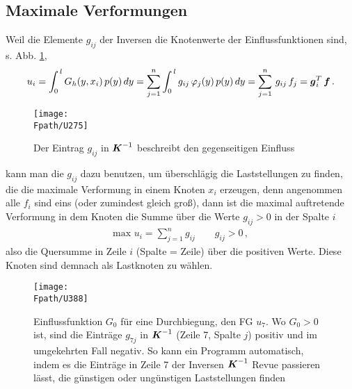 {%
{\textcolor{sectionTitleBlue}{\subsection{Maximale Verformungen}}}\label{Korrektur12}
Weil die Elemente $g_{ij}$ der Inversen die Knotenwerte der Einflussfunktionen sind, s. Abb. \ref{U275},
\begin{align}
u_i = \int_0^{\,l} G_h(y,x_i)\,p(y)\,dy = \sum_{j = 1}^n \int_0^{\,l} g_{ij}\,\varphi_j(y)\,p(y)\,dy = \sum_{j = 1}^n\,g_{ij}\,f_j
 = \mbox{\boldmath $g$}_i^T\,\mbox{\boldmath $f$}\,.
\end{align}
\begin{figure}
\centering
\if {} \sidecaption \fi
\texttt{[image: \\Fpath/U275]}
\caption{Der Eintrag $g_{ij}$ in $\mbox{\boldmath $K$}^{-1}$ beschreibt den gegenseitigen Einfluss }
\label{U275}%
\end{figure}%
kann man die $g_{ij}$ dazu benutzen, um \"{u}berschl\"{a}gig die Laststellungen zu finden, die die maximale Verformung in einem Knoten $x_i$ erzeugen, denn angenommen alle $f_i$ sind eins (oder zumindest gleich gro{\ss}), dann ist die maximal auftretende Verformung in dem Knoten die Summe \"{u}ber die Werte $g_{ij} > 0$ in der Spalte $i$
\begin{align}
\text{max}\,\,u_i = \sum_{j = 1}^n g_{ij} \qquad g_{ij} > 0\,,
\end{align}
also die \glq Quersumme\grq{} in Zeile $i$ (Spalte = Zeile) \"{u}ber die positiven Werte. Diese Knoten sind demnach als Lastknoten zu w\"{a}hlen.
\begin{figure}
\centering
\if {} \sidecaption \fi
\texttt{[image: \\Fpath/U388]}
\caption{Einflussfunktion $G_0$ f\"{u}r eine Durchbiegung, den FG $u_7$. Wo $G_0 > 0$ ist, sind die Eintr\"{a}ge $g_{7j}$ in $\mbox{\boldmath $K$}^{-1}$ (Zeile 7, Spalte $j$) positiv und im umgekehrten Fall negativ. So kann ein Programm automatisch, indem es die Eintr\"{a}ge in Zeile 7 der Inversen $\mbox{\boldmath $K$}^{-1}$ Revue passieren l\"{a}sst, die g\"{u}nstigen oder ung\"{u}nstigen Laststellungen finden}
\label{U388}%
\end{figure}%

}

